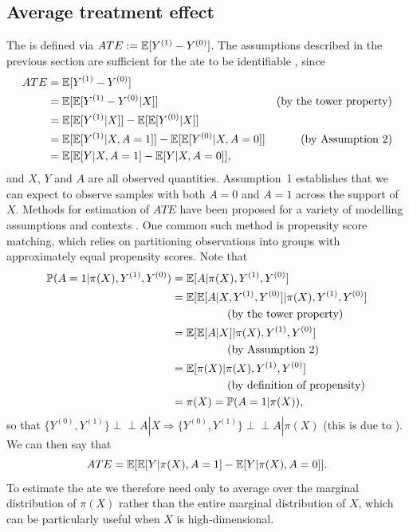 \documentclass[../thesis.tex]{subfiles}
\begin{document}
\subsection{Average treatment effect}
The  is defined via $ATE := \mathbb{E}[Y^{(1)} -Y^{(0)}]$. The assumptions described in the previous section are sufficient for the \gls{ate} to be identifiable \citep{stone_assumptions_1993}, since 
\begin{align*}
    ATE & = \mathbb{E}[Y^{(1)} - Y^{(0)} ] & \\
    & = \mathbb{E}[\mathbb{E}[Y^{(1)} - Y^{(0)} | X]] & \text{(by the tower property)} \\
    & = \mathbb{E}[\mathbb{E}[Y^{(1)} | X]] - \mathbb{E}[\mathbb{E}[Y^{(0)} | X]] & \\ 
    & = \mathbb{E}[\mathbb{E}[Y^{(1)} | X, A = 1]] - \mathbb{E}[\mathbb{E}[Y^{(0)} | X, A = 0]] & \text{(by Assumption~2)} \\
    & = \mathbb{E}[\mathbb{E}[Y | X, A = 1] - \mathbb{E}[Y | X, A = 0]], & \label{eq:ate}
\end{align*}
and $X$, $Y$ and $A$ are all observed quantities. Assumption~1 establishes that we can expect to observe samples with both $A=0$ and $A=1$ across the support of $X$. Methods for estimation of $ATE$ have been proposed for a variety of modelling assumptions and contexts \citep{reiersol_confluence_1945, thistlethwaite_regression-discontinuity_1960, rosenbaum_central_1983, abadie_semiparametric_2005, craig_natural_2017, roth_whats_2023}. One common such method is propensity score matching, which relies on partitioning observations into groups with approximately equal propensity scores. Note that 
\begin{align*}
    \mathbb{P}(A=1 | \pi(X), Y^{(1)}, Y^{(0)}) & = \mathbb{E}[A | \pi(X), Y^{(1)}, Y^{(0)}]  \\
    & = \mathbb{E}[\mathbb{E}[A | X, Y^{(1)}, Y^{(0)}] | \pi(X), Y^{(1)}, Y^{(0)}] \\
    & \hspace{50pt} \text{(by the tower property)}\\
    & = \mathbb{E}[\mathbb{E}[A|X]|\pi(X), Y^{(1)}, Y^{(0)}] \\ & \hspace{50pt} \text{(by Assumption~2)} \\
    & = \mathbb{E}[\pi(X) | \pi(X), Y^{(1)}, Y^{(0)}] 
 \\ & \hspace{50pt} \text{(by definition of propensity)} \\
    & = \pi(X) = \mathbb{P}(A=1|\pi(X)), 
\end{align*}
so that $\{Y^{(0)}, Y^{(1)}\} \perp\!\!\!\perp A | X \Rightarrow \{Y^{(0)}, Y^{(1)}\} \perp\!\!\!\perp A | \pi(X)$ (this is due to \citealt{rosenbaum_central_1983}). We can then say that
\[ATE = \mathbb{E}[\mathbb{E}[Y|\pi(X), A=1] - \mathbb{E}[Y|\pi(X), A=0]].\]
To estimate the \gls{ate} we therefore need only to average over the marginal distribution of $\pi(X)$ rather than the entire marginal distribution of $X$, which can be particularly useful when $X$ is high-dimensional.
\end{document}
